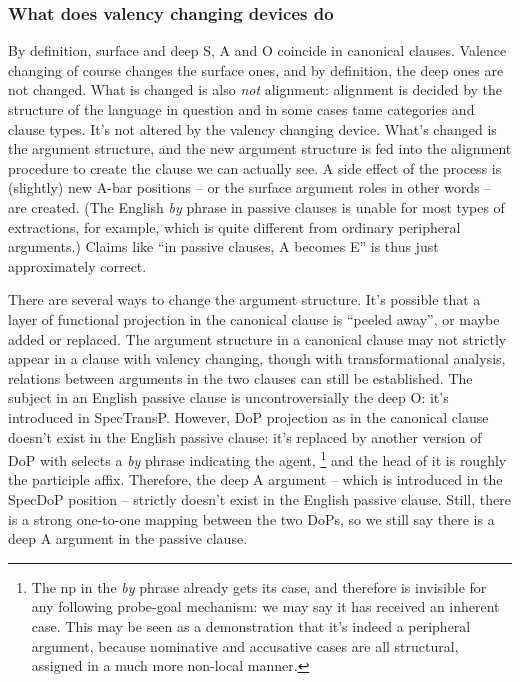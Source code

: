 \documentclass[UTF8, a4paper, oneside, scheme=plain]{ctexart}
\newcommand*{\corpus}[1]{\emph{#1}}
\begin{document}
\subsubsection{What does valency changing devices do}

By definition, surface and deep S, A and O coincide in canonical clauses. 
Valence changing of course changes the surface ones,
and by definition, the deep ones are not changed. 
What is changed is also \emph{not} alignment:
alignment is decided by the structure of the language in question
and in some cases \ac{tame} categories and clause types.
It's not altered by the valency changing device.
What's changed is the argument structure,
and the new argument structure is fed into the alignment procedure 
to create the clause we can actually see.
A side effect of the process is 
(slightly) new A-bar positions -- or the surface argument roles in other words -- 
are created. 
(The English \corpus{by} phrase in passive clauses
is unable for most types of extractions, for example,
which is quite different from ordinary peripheral arguments.) 
Claims like ``in passive clauses, A becomes E'' is thus just approximately correct.

There are several ways to change the argument structure.
It's possible that a layer of functional projection in the canonical clause is ``peeled away'',
or maybe added or replaced.
The argument structure in a canonical clause 
may not strictly appear in a clause with valency changing,
though with transformational analysis,
relations between arguments in the two clauses can still be established.
The subject in an English passive clause is uncontroversially the deep O:
it's introduced in SpecTransP.
However, DoP projection as in the canonical clause doesn't exist in the English passive clause:
it's replaced by another version of DoP with selects a \corpus{by} phrase indicating the agent,%
\footnote{
    The \ac{np} in the \corpus{by} phrase already gets its case,
    and therefore is invisible for any following probe-goal mechanism:
    we may say it has received an inherent case.
    This may be seen as a demonstration that it's indeed a peripheral argument,
    because nominative and accusative cases are all structural,
    assigned in a much more non-local manner.
}
and the head of it is roughly the participle affix.
Therefore, the deep A argument -- which is introduced in the SpecDoP position -- 
strictly doesn't exist in the English passive clause.
Still, there is a strong one-to-one mapping between the two DoPs,
so we still say there is a deep A argument in the passive clause.
\end{document}
